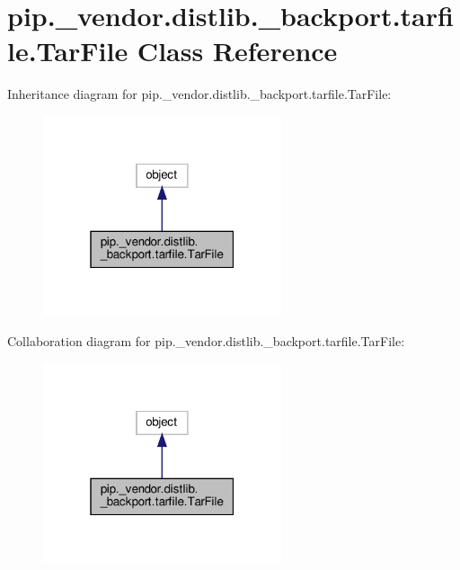 \hypertarget{classpip_1_1__vendor_1_1distlib_1_1__backport_1_1tarfile_1_1TarFile}{}\section{pip.\+\_\+vendor.\+distlib.\+\_\+backport.\+tarfile.\+Tar\+File Class Reference}
\label{classpip_1_1__vendor_1_1distlib_1_1__backport_1_1tarfile_1_1TarFile}


Inheritance diagram for pip.\+\_\+vendor.\+distlib.\+\_\+backport.\+tarfile.\+Tar\+File\+:
\nopagebreak
\begin{figure}[H]
\begin{center}
\leavevmode
\includegraphics[width=199pt]{classpip_1_1__vendor_1_1distlib_1_1__backport_1_1tarfile_1_1TarFile__inherit__graph}
\end{center}
\end{figure}


Collaboration diagram for pip.\+\_\+vendor.\+distlib.\+\_\+backport.\+tarfile.\+Tar\+File\+:
\nopagebreak
\begin{figure}[H]
\begin{center}
\leavevmode
\includegraphics[width=199pt]{classpip_1_1__vendor_1_1distlib_1_1__backport_1_1tarfile_1_1TarFile__coll__graph}
\end{center}
\end{figure}
